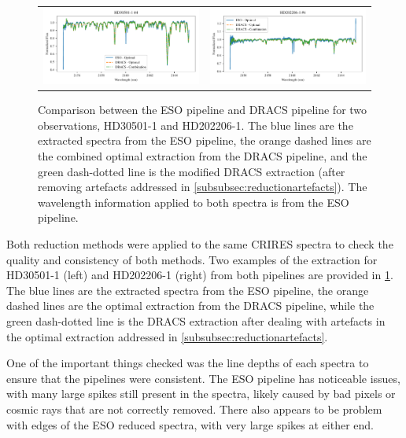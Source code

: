 \begin{figure}
\begin{tabular}{cc}
        \includegraphics[width=0.5\linewidth]{figures/reduction/pipeline_compare/pipeline_compare_HD30501-1_chip_4} & \includegraphics[width=0.5\linewidth]{figures/reduction/pipeline_compare/pipeline_compare_HD202206-1_chip_4}\\
    \end{tabular}
    \caption{Comparison between the {ESO} pipeline and {DRACS} pipeline for two observations, {HD30501-1} and {HD202206-1}.
        The blue lines are the extracted spectra from the {ESO} pipeline, the orange dashed lines are the combined optimal extraction from the {DRACS} pipeline, and the green dash-dotted line is the modified {DRACS} extraction (after removing artefacts addressed in \cref{subsubsec:reductionartefacts}).
        The wavelength information applied to both spectra is from the {ESO} pipeline.}
    \label{fig:reduction-comparison}
\end{figure}

Both reduction methods were applied to the same {CRIRES} spectra to check the quality and consistency of both methods.
Two examples of the extraction for HD30501-1 (left) and HD202206-1 (right) from both pipelines are provided in \cref{fig:reduction-comparison}.
The blue lines are the extracted spectra from the {ESO} pipeline, the orange dashed lines are the optimal extraction from the {DRACS} pipeline, while the green dash-dotted line is the {DRACS} extraction after dealing with artefacts in the optimal extraction addressed in \cref{subsubsec:reductionartefacts}.

One of the important things checked was the line depths of each spectra to ensure that the pipelines were consistent.
The {ESO} pipeline has noticeable issues, with many large spikes still present in the spectra, likely caused by bad pixels or cosmic rays that are not correctly removed.
There also appears to be problem with edges of the {ESO} reduced spectra, with very large spikes at either end.

